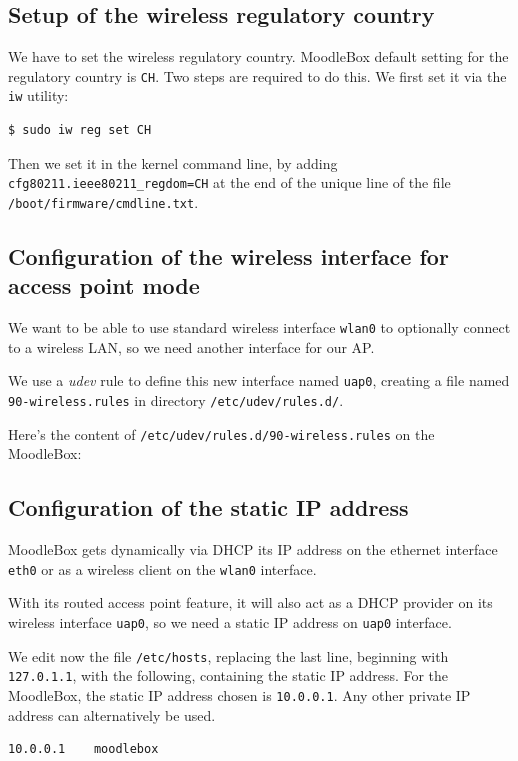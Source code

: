 \documentclass[12pt]{article}
\begin{document}
\subsection{Setup of the wireless regulatory country}

We have to set the wireless regulatory country.
MoodleBox default setting for the regulatory country is \lstinline{CH}.
Two steps are required to do this.
We first set it via the \lstinline{iw} utility:
\begin{lstlisting}[language=bash]
$ sudo iw reg set CH
\end{lstlisting}
Then we set it in the kernel command line, by adding \lstinline{cfg80211.ieee80211_regdom=CH} at the end of the unique line of the file \lstinline{/boot/firmware/cmdline.txt}.

\subsection{Configuration of the wireless interface for access point mode}

We want to be able to use standard wireless interface \lstinline{wlan0} to optionally connect to a wireless LAN, so we need another interface for our AP.

We use a \textsl{udev} rule to define this new interface named \lstinline{uap0}, creating a file named \lstinline{90-wireless.rules} in directory \lstinline{/etc/udev/rules.d/}.

Here's the content of \lstinline{/etc/udev/rules.d/90-wireless.rules} on the MoodleBox:


\subsection{Configuration of the static IP address}\label{ssec-static-ip}

MoodleBox gets dynamically via DHCP its IP address on the ethernet interface \lstinline{eth0} or as a wireless client on the \lstinline{wlan0} interface.

With its routed access point feature, it will also act as a DHCP provider on its wireless interface \lstinline{uap0}, so we need a static IP address on \lstinline{uap0} interface.

We edit now the file \lstinline{/etc/hosts}, replacing the last line, beginning with \lstinline{127.0.1.1}, with the following, containing the static IP address.
For the MoodleBox, the static IP address chosen is \lstinline{10.0.0.1}.
Any other private IP address can alternatively be used.
\begin{lstlisting}[language=bash]
10.0.0.1	moodlebox
\end{lstlisting}
\end{document}
